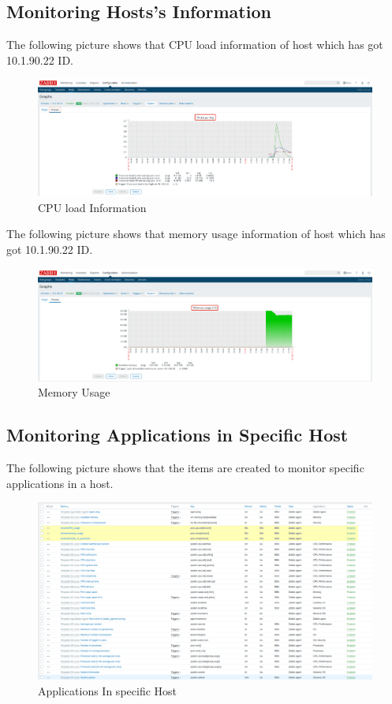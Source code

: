 \documentclass{article}
\begin{document}
\subsection{ Monitoring Hosts’s Information}

The following picture shows that CPU load information of host which has got 10.1.90.22 ID.

\begin{figure}[H]
\centering
\includegraphics[scale=0.3,width=\linewidth]{ana_host_cpu}
\caption{CPU load Information}
\end{figure}


The following picture shows that memory usage information of host which has got 10.1.90.22 ID.

\begin{figure}[H]
\centering
\includegraphics[scale=0.3,width=\linewidth]{ana_host_memory}
\caption{Memory Usage}
\end{figure}



\subsection{ Monitoring Applications in Specific Host}

The following picture shows that the items are created to monitor specific applications in a host. 

\begin{figure}[H]
\centering
\includegraphics[scale=0.3,width=\linewidth]{item_eklendi1}
\caption{Applications In specific Host}
\end{figure}
\end{document}

